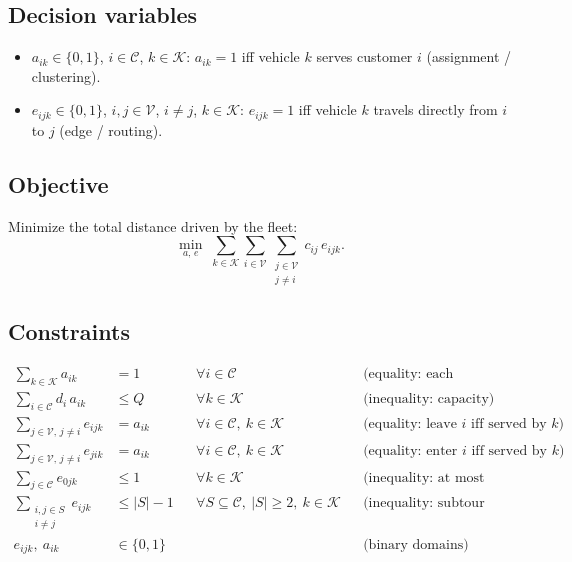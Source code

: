 \documentclass[10pt]{article}
\newcommand{\C}{\mathcal{C}}      %
\newcommand{\V}{\mathcal{V}}      %
\newcommand{\K}{\mathcal{K}}      %
\begin{document}
\subsection{Decision variables}
\begin{itemize}
  \item $a_{ik} \in \{0,1\}$, $i \in \C$, $k \in \K$: $a_{ik}=1$ iff vehicle $k$ serves customer $i$ (assignment / clustering).
  \item $e_{ijk} \in \{0,1\}$, $i,j \in \V$, $i \ne j$, $k \in \K$: $e_{ijk}=1$ iff vehicle $k$ travels directly from $i$ to $j$ (edge / routing).
\end{itemize}

\subsection{Objective}
Minimize the total distance driven by the fleet:
\begin{equation}
  \min_{a,\,e} \; \sum_{k \in \K} \sum_{i \in \V} \sum_{\substack{j \in \V \\ j \ne i}} c_{ij}\, e_{ijk}.
  \label{eq:obj}
\end{equation}

\subsection{Constraints}
\begin{align}
  \sum_{k \in \K} a_{ik} &= 1
    && \forall i \in \C
    && \text{(equality: each customer served exactly once)} \tag{C1}\label{c:assign}\\
  \sum_{i \in \C} d_i\, a_{ik} &\le Q
    && \forall k \in \K
    && \text{(inequality: capacity)} \tag{C2}\label{c:cap}\\
  \sum_{j \in \V,\, j \ne i} e_{ijk} &= a_{ik}
    && \forall i \in \C,\ k \in \K
    && \text{(equality: leave $i$ iff served by $k$)} \tag{C3}\label{c:out}\\
  \sum_{j \in \V,\, j \ne i} e_{jik} &= a_{ik}
    && \forall i \in \C,\ k \in \K
    && \text{(equality: enter $i$ iff served by $k$)} \tag{C4}\label{c:in}\\
  \sum_{j \in \C} e_{0jk} &\le 1
    && \forall k \in \K
    && \text{(inequality: at most one trip per vehicle)} \tag{C5}\label{c:depot}\\
  \sum_{\substack{i,j \in S \\ i \ne j}} e_{ijk} &\le |S| - 1
    && \forall S \subseteq \C,\ |S| \ge 2,\ k \in \K
    && \text{(inequality: subtour elimination)} \tag{C6}\label{c:subtour}\\
  e_{ijk},\ a_{ik} &\in \{0,1\}
    && && \text{(binary domains)} \tag{C7}\label{c:bin}
\end{align}
\end{document}
